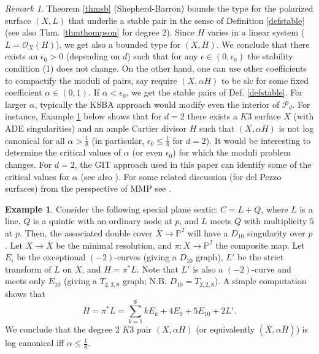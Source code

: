 \documentclass{amsart}
\numberwithin{equation}{section}
\theoremstyle{plain}
\theoremstyle{remark}
\newtheorem{remark}[equation]{Remark}
\theoremstyle{definition}
\newtheorem{example}[equation]{Example}
\newcommand{\bP}{\mathbb{P}}
\newcommand{\calO}{\mathcal{O}}
\newcommand{\calP}{\mathcal{P}}
\begin{document}
\begin{remark}\label{remcoef} Theorem \ref{thmsb} (Shepherd-Barron) bounds the type for the polarized surface $(X,L)$ that underlie a stable pair in the sense of Definition \ref{defstable} (see also Thm. \ref{thmthompson} for degree $2$). Since $H$ varies in a linear system ($L=\calO_X(H)$), we get also a bounded type for $(X,H)$.  
We conclude that there exists an $\epsilon_0>0$ (depending on $d$) such that for any $\epsilon\in(0,\epsilon_0)$ the stability condition (1)  does not change.
On the other hand, one can use other coefficients to compactify the moduli of pairs, say require $(X,\alpha H)$ to be slc for some fixed coefficient $\alpha\in(0,1)$. If $\alpha<\epsilon_0$, we get the stable pairs of Def. \ref{defstable}. For larger $\alpha$, typically the KSBA approach would modify even the interior of $\calP_d$. For instance, Example \ref{examplealpha} below shows that for $d=2$ there exists a $K3$ surface $X$ (with ADE singularities) and an ample Cartier divisor $H$ such that  $(X,\alpha H)$ is not log canonical for all $\alpha>\frac{1}{8}$  (in particular, $\epsilon_0\le \frac{1}{8}$ for $d=2$). It would be interesting to determine the critical values of $\alpha$ (or even $\epsilon_0$) for which the moduli problem changes. For $d= 2$, the GIT approach used in this paper can identify  some of the critical values for $\alpha$ (see also \cite{raduthesis}). For some related discussion (for del Pezzo surfaces) from the perspective of MMP see \cite{cheltsov}.
\end{remark}
\begin{example}\label{examplealpha}
Consider the following special plane sextic: $C=L+Q$, where $L$ is a line, $Q$ is a quintic with an ordinary node at $p$, and $L$ meets $Q$ with multiplicity $5$ at $p$. Then, the associated double cover $\overline{X}\to \bP^2$ will have a $D_{10}$ singularity over $p$. Let $X\to \overline{X}$ be the minimal resolution, and $\pi:X\to \bP^2$ the composite map. Let $E_i$ be the exceptional $(-2)$-curves (giving a $D_{10}$ graph), $L'$ be the strict transform of $L$ on $X$, and $H=\pi^*L$. Note that $L'$ is also a $(-2)$-curve and meets only $E_{10}$ (giving a $T_{2,3,8}$ graph; N.B. $D_{10}=T_{2,2,8}$). A simple computation shows that 
$$H=\pi^* L=\sum_{k=1}^8 k E_k+4E_9+5E_{10}+2L'.$$
 We conclude that the degree $2$ $K3$ pair $(X,\alpha H)$ (or equivalently $(\overline X,\alpha \overline H)$) is log canonical iff $\alpha\le \frac{1}{8}$.  
\end{example}
\end{document}
